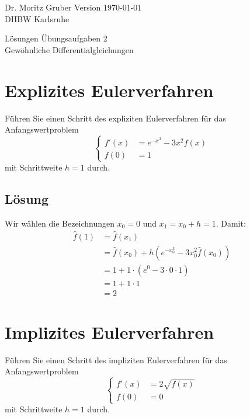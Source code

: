 
\usepackage{stix}



\vspace*{-20mm}
{
	\color{dhbwGray}
	Dr. Moritz Gruber	\hfill Version \today\\
	DHBW Karlsruhe\\
}

\vspace{10mm}
\begin{center}
	{
		{ \LARGE Lösungen Übungsaufgaben 2}\\[3mm]
		{\Large Gewöhnliche Differentialgleichungen}
	}
\end{center}

\vspace{5mm}




\section{Explizites Eulerverfahren}
Führen Sie einen Schritt des expliziten Eulerverfahren für das Anfangswertproblem
$$
\begin{cases}
f'(x)&=e^{-x^3}-3x^2 f(x)\\
f(0)&=1
\end{cases}
$$
mit Schrittweite $h=1$ durch.
\subsection*{Lösung}
Wir wählen die Bezeichnungen $x_0=0$ und $x_1=x_0+h=1$. Damit:
\begin{align*}
\hat f(1)&=\hat f(x_1)\\
&=\hat f(x_0)+h \left(e^{-x_0^3}-3x_0^2 \hat f(x_0)\right)\\
&=1+1\cdot (e^0-3\cdot 0 \cdot 1)\\
&=1+1\cdot 1\\
&=2
\end{align*}

\newpage
\section{Implizites Eulerverfahren}
Führen Sie einen Schritt des impliziten Eulerverfahren für das Anfangswertproblem
$$
\begin{cases}
f'(x)&=2\sqrt{f(x)}\\
f(0)&=0
\end{cases}
$$
mit Schrittweite $h=1$ durch.


